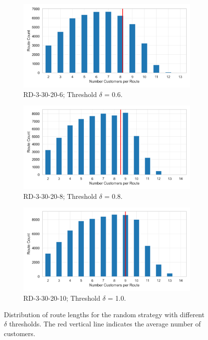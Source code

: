 \begin{figure}[ht]
	\centering
	\begin{subfigure}[t]{.5\textwidth}
		\centering
		\includegraphics[width=\linewidth]{pictures/dataset_structure/no_cust_plot_RandomData_3_30_20_6.png}
		\caption{RD-3-30-20-6; Threshold $\delta$ = 0.6.}
		\label{fig:ds-a}
	\end{subfigure}%
	\begin{subfigure}[t]{.5\textwidth}
		\centering
		\includegraphics[width=\linewidth]{pictures/dataset_structure/no_cust_plot_RandomData_3_30_20_8.png}
		\caption{RD-3-30-20-8; Threshold $\delta$ = 0.8.}
		\label{fig:ds-b}
	\end{subfigure}
	\begin{subfigure}{.5\textwidth}
		\centering
		\includegraphics[width=\linewidth]{pictures/dataset_structure/no_cust_plot_RandomData_3_30_20_10.png}
		\caption{RD-3-30-20-10; Threshold $\delta$ = 1.0.}
		\label{fig:ds-c}
	\end{subfigure}
	\caption[Distribution of route lengths for the random strategy with different $\delta$ thresholds.]
	{Distribution of route lengths for the random strategy with different $\delta$ thresholds. The red vertical line indicates the average number of customers.}
	\label{fig:route-dists_randomdata}
\end{figure}


